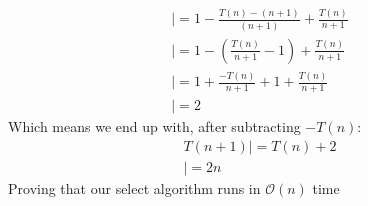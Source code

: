 \documentclass{report}
\begin{document}
{\begin{align*}
        |= 1 - \frac{T(n) - (n + 1)}{\left(n+1\right)} + \displaystyle\frac{T(n)}{n+1} \\
        |= 1 - \left(\displaystyle\frac{T(n)}{n+1} - 1\right) + \displaystyle\frac{T(n)}{n+1} \\
        |= 1 + \displaystyle\frac{-T(n)}{n+1} + 1 + \displaystyle\frac{T(n)}{n+1} \\
        |= 2
    \end{align*}
    Which means we end up with, after subtracting \(-T(n)\):
    \begin{align*}
        T(n + 1) |= T(n) + 2 \\
        |= 2n
    \end{align*}
    Proving that our select algorithm runs in \(\mathcal{O}(n)\) time
    
}
\end{document}
